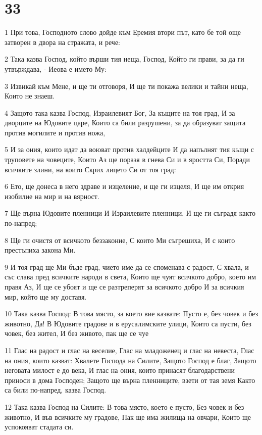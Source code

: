 \chapter{33}

\par 1 При това, Господното слово дойде към Еремия втори път, като бе той още затворен в двора на стражата, и рече:
\par 2 Така казва Господ, който върши тия неща, Господ, Който ги прави, за да ги утвърждава, - Иеова е името Му:
\par 3 Извикай към Мене, и ще ти отговоря, И ще ти покажа велики и тайни неща, Които не знаеш.
\par 4 Защото така казва Господ, Израилевият Бог, За къщите на тоя град, И за дворците на Юдовите царе, Които са били разрушени, за да образуват защита против могилите и против ножа,
\par 5 И за ония, които идат да воюват против халдейците И да напълнят тия къщи с труповете на човеците, Които Аз ще поразя в гнева Си и в яростта Си, Поради всичките злини, на които Скрих лицето Си от тоя град:
\par 6 Ето, ще донеса в него здраве и изцеление, и ще ги изцеля, И ще им открия изобилие на мир и на вярност.
\par 7 Ще върна Юдовите пленници И Израилевите пленници, И ще ги съградя както по-напред;
\par 8 Ще ги очистя от всичкото беззаконие, С които Ми съгрешиха, И с които престъпиха закона Ми.
\par 9 И тоя град ще Ми бъде град, чието име да се споменава с радост, С хвала, и със слава пред всичките народи в света, Които ще чуят всичкото добро, което им правя Аз, И ще се убоят и ще се разтреперят за всичкото добро И за всичкия мир, който ще му доставя.
\par 10 Така казва Господ: В това място, за което вие казвате: Пусто е, без човек и без животно, Да! В Юдовите градове и в ерусалимските улици, Които са пусти, без човек, без жител, И без живото, пак ще се чуе
\par 11 Глас на радост и глас на веселие, Глас на младоженец и глас на невеста, Глас на ония, които казват: Хвалете Господа на Силите, Защото Господ е благ, Защото неговата милост е до века, И глас на ония, които принасят благодарствени приноси в дома Господен; Защото ще върна пленниците, взети от тая земя Както са били по-напред, казва Господ.
\par 12 Така казва Господ на Силите: В това място, което е пусто, Без човек и без животно, И във всичките му градове, Пак ще има жилища на овчари, Които ще успокояват стадата си.
